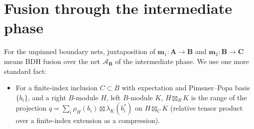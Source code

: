 \documentclass[11pt]{article}
\theoremstyle{definition}
\theoremstyle{remark}
\newcommand{\cA}{\mathcal A}
\newcommand{\bfB}{\mathbf B}
\newcommand{\bfA}{\mathbf A}
\newcommand{\bfC}{\mathbf C}
\newcommand{\fus}{\boxtimes}
\begin{document}
\section{Fusion through the intermediate phase}
For the unpinned boundary nets, juxtaposition of $\mathbf m_1\colon\bfA\to\bfB$ and $\mathbf m_2\colon\bfB\to\bfC$ means BDH fusion over the net $\cA_{\bfB}$ of the intermediate phase. We use one more standard fact:
\begin{itemize}[leftmargin=2.6em]
\item[(L4)] For a finite-index inclusion $C\subset B$ with expectation and Pimsner--Popa basis $\{b_i\}$, and a right $B$-module $H$, left $B$-module $K$, $H\fus_BK$ is the range of the projection $q=\sum_i\rho_H(b_i)\fus\lambda_K(b_i^*)$ on $H\fus_CK$ (relative tensor product over a finite-index extension as a compression).
\end{itemize}
\end{document}
